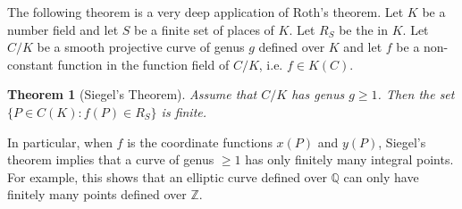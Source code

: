 \documentclass[12pt]{article}
\newtheorem*{thm}{Theorem}
\theoremstyle{definition}
\newcommand{\Ints}{\mathbb{Z}}
\newcommand{\Rats}{\mathbb{Q}}
\begin{document}
The following theorem is a very deep application of Roth's theorem. Let $K$ be a number field and let $S$ be a finite set of places of $K$. Let $R_S$ be the  in $K$. Let $C/K$ be a smooth projective curve of genus $g$ defined over $K$ and let $f$ be a non-constant function in the function field of $C/K$, i.e. $f\in K(C)$. 

\begin{thm}[Siegel's Theorem]
Assume that $C/K$ has genus $g\geq 1$. Then the set $\{P\in C(K) : f(P) \in R_S\}$ is finite.
\end{thm} 

In particular, when $f$ is the coordinate functions $x(P)$ and $y(P)$, Siegel's theorem implies that a curve of genus $\geq 1$ has only finitely many integral points. For example, this shows that an elliptic curve defined over $\Rats$ can only have finitely many points defined over $\Ints$.
\end{document}
